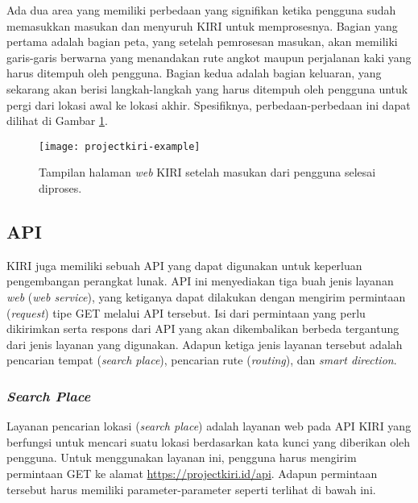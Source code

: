 Ada dua area yang memiliki perbedaan yang signifikan ketika pengguna sudah memasukkan masukan dan menyuruh KIRI untuk memprosesnya. Bagian yang pertama adalah bagian peta, yang setelah pemrosesan masukan, akan memiliki garis-garis berwarna yang menandakan rute angkot maupun perjalanan kaki yang harus ditempuh oleh pengguna. Bagian kedua adalah bagian keluaran, yang sekarang akan berisi langkah-langkah yang harus ditempuh oleh pengguna untuk pergi dari lokasi awal ke lokasi akhir. Spesifiknya, perbedaan-perbedaan ini dapat dilihat di Gambar \ref{fig:kiri-example}.

\begin{figure}[h]
    \centering
    \texttt{[image: projectkiri-example]}
    \caption[Tampilan halaman web KIRI sesudah masukan diproses]{Tampilan halaman \textit{web} KIRI setelah masukan dari pengguna selesai diproses.}
    \label{fig:kiri-example}
\end{figure}
\vspace{-1em}
\subsection{API\footnotemark}
\label{sec:kiri-api}

KIRI juga memiliki sebuah API yang dapat digunakan untuk keperluan pengembangan perangkat lunak. API ini menyediakan tiga buah jenis layanan \textit{web} (\textit{web service}), yang ketiganya dapat dilakukan dengan mengirim permintaan (\textit{request}) tipe GET melalui API tersebut. Isi dari permintaan yang perlu dikirimkan serta respons dari API yang akan dikembalikan berbeda tergantung dari jenis layanan yang digunakan. Adapun ketiga jenis layanan tersebut adalah pencarian tempat (\textit{search place}), pencarian rute (\textit{routing}), dan \textit{smart direction}.
 
\subsubsection{\textit{Search Place}}
\label{sec:kiri-api-searchplace}

Layanan pencarian lokasi (\textit{search place}) adalah layanan web pada API KIRI yang berfungsi untuk mencari suatu lokasi berdasarkan kata kunci yang diberikan oleh pengguna. Untuk menggunakan layanan ini, pengguna harus mengirim permintaan GET ke alamat \href{https://projectkiri.id/api}{https://projectkiri.id/api}. Adapun permintaan tersebut harus memiliki parameter-parameter seperti terlihat di bawah ini.

